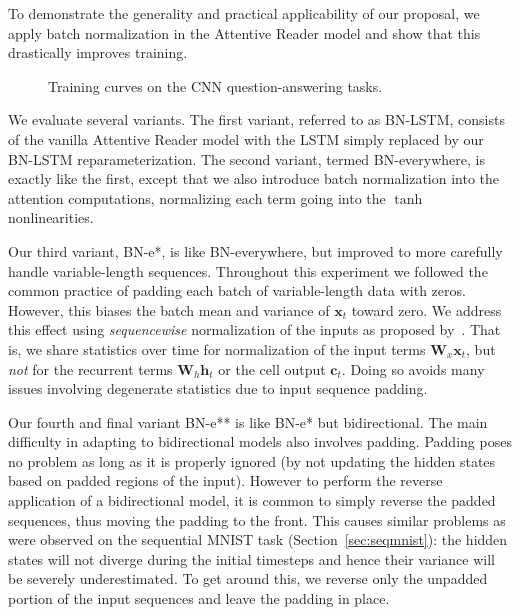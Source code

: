 \documentclass{article} \pdfoutput=1 \usepackage[utf8]{inputenc}
\newcommand{\vect}[1]{\mathbf{#1}}
\newcommand{\mat}[1]{\mathbf{#1}}
\begin{document}
To demonstrate the generality and practical applicability of our proposal,
we apply batch normalization in the Attentive Reader model
and show that this drastically improves training.

\begin{figure}[!ht]
  \center {}\hspace{2mm}
  \caption{Training curves on the CNN question-answering tasks.}
  \label{fig:attr2}
\end{figure}

We evaluate several variants.  The first variant, referred to as BN-LSTM,
consists of the vanilla Attentive Reader model with the LSTM simply replaced by
our BN-LSTM reparameterization.  The second variant, termed BN-everywhere, is
exactly like the first, except that we also introduce batch normalization into
the attention computations, normalizing each term going into the $\tanh$
nonlinearities.

Our third variant, BN-e*, is like BN-everywhere, but improved to more carefully
handle variable-length sequences.  Throughout this experiment we followed the
common practice of padding each batch of variable-length data with zeros.
However, this biases the batch mean and variance of $\vect{x}_t$ toward zero.
We address this effect using \emph{sequencewise} normalization of the inputs as
proposed by~\citet{cesar,baidu}.  That is, we share statistics over time for
normalization of the input terms $\mat{W}_x \vect{x}_t$, but \emph{not} for the
recurrent terms $\mat{W}_h \vect{h}_t$ or the cell output $\vect{c}_t$.  Doing
so avoids many issues involving degenerate statistics due to input sequence
padding.

Our fourth and final variant BN-e** is like BN-e* but bidirectional.  The main
difficulty in adapting to bidirectional models also involves padding.  Padding
poses no problem as long as it is properly ignored (by not updating the hidden
states based on padded regions of the input).  However to perform the reverse
application of a bidirectional model, it is common to simply reverse the padded
sequences, thus moving the padding to the front.  This causes similar problems
as were observed on the sequential MNIST task (Section~\ref{sec:seqmnist}): the
hidden states will not diverge during the initial timesteps and hence their
variance will be severely underestimated.  To get around this, we reverse only
the unpadded portion of the input sequences and leave the padding in place.
\end{document}
